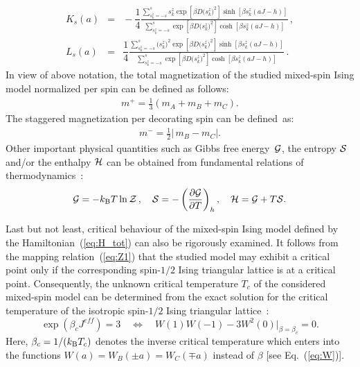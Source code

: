 \documentclass[final,5p,times,sort&compress]{elsarticle}
\begin{document}
\begin{eqnarray}
\label{eq:FSGS}
K_s(a) \!\!\!&=&\!\!\! -\dfrac{1}{4}\frac{\displaystyle\sum\limits_{s_{k}^{z}= -s}^s\!\!s_{k}^z\exp{\left[\beta D \big(s_{k}^{z}\big)^{2}\right]}\sinh\left[\beta s_{k}^{z}(a J -h)\right]}{\displaystyle\sum\limits_{s_{k}^{z}= -s}^s\!\!\exp{\left[\beta D \big(s_{k}^{z}\big)^{2}\right]}\cosh\left[\beta s_{k}^{z}(a J -h)\right]}\,,
\\
L_s(a) \!\!\!&=&\!\!\! \dfrac{1}{4}\frac{\displaystyle\sum\limits_{s_{k}^{z}= -s}^s\!\!\big(s_{k}^{z}\big)^{2}\exp{\left[\beta D \big(s_{k}^{z}\big)^{2}\right]}\sinh\left[\beta s_{k}^{z}(a J -h)\right]}{\displaystyle\sum\limits_{s_{k}^{z}= -s}^s\!\!\exp{\left[\beta D \big(s_{k}^{z}\big)^{2}\right]}\cosh\left[\beta s_{k}^{z}(a J -h)\right]}\,.
\end{eqnarray}
In view of above notation, the total magnetization of the studied mixed-spin Ising model normalized per spin can be defined as follows:
\begin{eqnarray}
\label{eq:m+}
m^{+} = \frac{1}{3}\left(m_A + m_B + m_C\right).
\end{eqnarray}
The staggered magnetization per decorating spin can be defined~as:
\begin{eqnarray}
\label{eq:m-}
m^{-} = \frac{1}{2}\left|\,m_B - m_C\right|.
\end{eqnarray}
Other important physical quantities such as Gibbs free energy~${\cal G}$, the entropy ${\cal S}$ and/or the enthalpy ${\cal H}$ can be obtained from fundamental relations of thermodynamics~\cite{Kit58}:
\begin{equation}
\label{eq:GSHCchi}
{\cal G} = -k_{\rm B}T\ln{\cal Z}\,,\quad
{\cal S} = -\left(\frac{\partial{\cal G}}{\partial T}\right)_{h},\quad
{\cal H} = {\cal G} + T{\cal S}.
\end{equation}

Last but not least, critical behaviour of the mixed-spin Ising model defined by the Hamiltonian~(\ref{eq:H_tot}) can also be rigorously examined. It follows from the mapping relation~(\ref{eq:Z1}) that the studied model may exhibit a critical point only if the corresponding spin-$1/2$ Ising triangular lattice is at a critical point. Consequently, the unknown critical temperature $T_c$ of the considered mixed-spin model can be determined from the exact solution for the critical temperature of the isotropic spin-$1/2$ Ising triangular lattice~\cite{Hou50}:
 \begin{equation}
\label{eq:Tc}
\exp{\left(\beta_cJ^{e\!f\!f}\right)} = 3
\quad\Leftrightarrow\quad
W(1)W(-1) - 3W^2(0)\big|_{\beta = \beta_c} = 0.
\end{equation}
Here, $\beta_c = 1/(k_{\rm B}T_c)$ denotes the inverse critical temperature which enters into the functions $W(a) = W_B(\pm a) = W_C(\mp a)$ instead of $\beta$ [see Eq.~(\ref{eq:W})].
\end{document}
